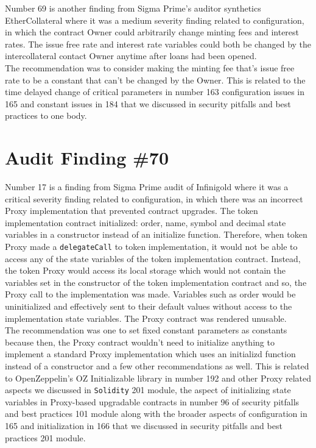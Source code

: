 Number 69 is another finding from Sigma Prime's auditor synthetics EtherCollateral where it was a medium severity finding related to configuration, in which the contract Owner could arbitrarily change minting fees and interest rates. The issue free rate and interest rate variables could both be changed by the intercollateral contact Owner anytime after loans had been opened.\\

The recommendation was to consider making the minting fee that's issue free rate to be a constant that can't be changed by the Owner. This is related to the time delayed change of critical parameters in number 163 configuration issues in 165 and constant issues in 184 that we discussed in security pitfalls and best practices to one body.

\section{Audit Finding \#70}

Number 17 is a finding from Sigma Prime audit of Infinigold where it was a critical severity finding related to configuration, in which there was an incorrect Proxy implementation that prevented contract upgrades. The token implementation contract initialized: order, name, symbol and decimal state variables in a constructor instead of an initialize function. Therefore, when token Proxy made a \verb|delegateCall| to token implementation, it would not be able to access any of the state variables of the token implementation contract. Instead, the token Proxy would access its local storage which would not contain the variables set in the constructor of the token implementation contract and so, the Proxy call to the implementation was made. Variables such as order would be uninitialized and effectively sent to their default values without access to the implementation state variables. The Proxy contract was rendered unusable.\\

The recommendation was one to set fixed constant parameters as constants because then, the Proxy contract wouldn't need to initialize anything to implement a standard Proxy implementation which uses an initializd function instead of a constructor and a few other recommendations as well. This is related to OpenZeppelin's OZ Initializable library in number 192 and other Proxy related aspects we discussed in \verb|Solidity| 201 module, the aspect of initializing state variables in Proxy-based upgradable contracts in number 96 of security pitfalls and best practices 101 module along with the broader aspects of configuration in 165 and initialization in 166 that we discussed in security pitfalls and best practices 201 module.

